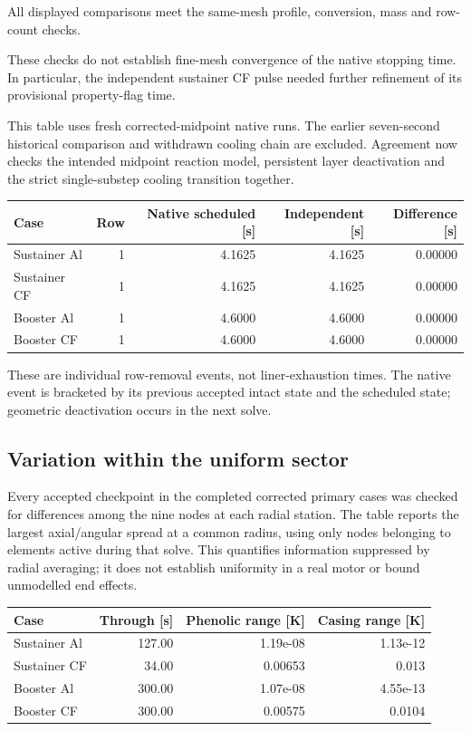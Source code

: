 \documentclass[oneside,openany]{amsdtx}
\begin{document}
All displayed comparisons meet the same-mesh profile, conversion, mass and row-count checks.

These checks do not establish fine-mesh convergence of the native stopping time. In particular, the independent sustainer CF pulse needed further refinement of its provisional property-flag time.

This table uses fresh corrected-midpoint native runs. The earlier seven-second historical comparison and withdrawn cooling chain are excluded. Agreement now checks the intended midpoint reaction model, persistent layer deactivation and the strict single-substep cooling transition together.

\begin{table}[H]\centering\scriptsize\begin{tabular}{lrrrr}\toprule Case & Row & Native scheduled [s] & Independent [s] & Difference [s]\\\midrule

Sustainer Al & 1 & 4.1625 & 4.1625 & 0.00000 \\
Sustainer CF & 1 & 4.1625 & 4.1625 & 0.00000 \\
Booster Al & 1 & 4.6000 & 4.6000 & 0.00000 \\
Booster CF & 1 & 4.6000 & 4.6000 & 0.00000 \\

\bottomrule\end{tabular}\end{table}

These are individual row-removal events, not liner-exhaustion times. The native event is bracketed by its previous accepted intact state and the scheduled state; geometric deactivation occurs in the next solve.

\subsection{Variation within the uniform sector}

Every accepted checkpoint in the completed corrected primary cases was checked for differences among the nine nodes at each radial station. The table reports the largest axial/angular spread at a common radius, using only nodes belonging to elements active during that solve. This quantifies information suppressed by radial averaging; it does not establish uniformity in a real motor or bound unmodelled end effects.

\begin{table}[H]\centering\scriptsize\begin{tabular}{lrrr}\toprule Case & Through [s] & Phenolic range [K] & Casing range [K]\\\midrule

Sustainer Al & 127.00 & 1.19e-08 & 1.13e-12 \\
Sustainer CF & 34.00 & 0.00653 & 0.013 \\
Booster Al & 300.00 & 1.07e-08 & 4.55e-13 \\
Booster CF & 300.00 & 0.00575 & 0.0104 \\

\bottomrule\end{tabular}\end{table}
\end{document}
